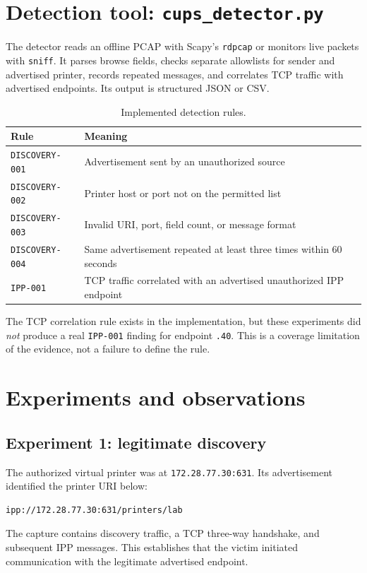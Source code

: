 \documentclass[11pt,a4paper]{article}
\begin{document}
\section{Detection tool: \texttt{cups\_detector.py}}
The detector reads an offline PCAP with Scapy's \texttt{rdpcap} or monitors live packets with \texttt{sniff}. It parses browse fields, checks separate allowlists for sender and advertised printer, records repeated messages, and correlates TCP traffic with advertised endpoints. Its output is structured JSON or CSV.

\begin{table}[htbp]\centering\small
\caption{Implemented detection rules.}
\begin{tabularx}{\linewidth}{@{}l X@{}}\toprule
Rule & Meaning\\\midrule
\texttt{DISCOVERY-001} & Advertisement sent by an unauthorized source\\
\texttt{DISCOVERY-002} & Printer host or port not on the permitted list\\
\texttt{DISCOVERY-003} & Invalid URI, port, field count, or message format\\
\texttt{DISCOVERY-004} & Same advertisement repeated at least three times within 60 seconds\\
\texttt{IPP-001} & TCP traffic correlated with an advertised unauthorized IPP endpoint\\\bottomrule
\end{tabularx}
\end{table}

The TCP correlation rule exists in the implementation, but these experiments did \emph{not} produce a real \texttt{IPP-001} finding for endpoint \texttt{.40}. This is a coverage limitation of the evidence, not a failure to define the rule.

\section{Experiments and observations}
\subsection{Experiment 1: legitimate discovery}
The authorized virtual printer was at \texttt{172.28.77.30:631}. Its advertisement identified the printer URI below:
\begin{lstlisting}
ipp://172.28.77.30:631/printers/lab
\end{lstlisting}
The capture  contains discovery traffic, a TCP three-way handshake, and subsequent IPP messages. This establishes that the victim initiated communication with the legitimate advertised endpoint.
\end{document}
